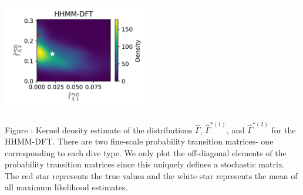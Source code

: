 \documentclass{article}
\begin{document}
\begin{center}
        \includegraphics[width=2.5in]{../Plots/hhmm_FV_uncorr_Gamma_density_1_row_2.png}
        \end{center}
        
        \noindent Figure : Kernel density estimate of the distributions $\hat \Gamma$, $\hat \Gamma^{*(1)}$, and $\hat \Gamma^{*(2)}$ for the HHMM-DFT. There are two fine-scale probability transition matrices- one corresponding to each dive type. We only plot the off-diagonal elements of the probability transition matrices since this uniquely defines a stochastic matrix. The red star represents the true values and the white star represents the mean of all maximum likelihood estimates.
        \addtocounter{fignum}{1}
        
        \newpage
\end{document}
